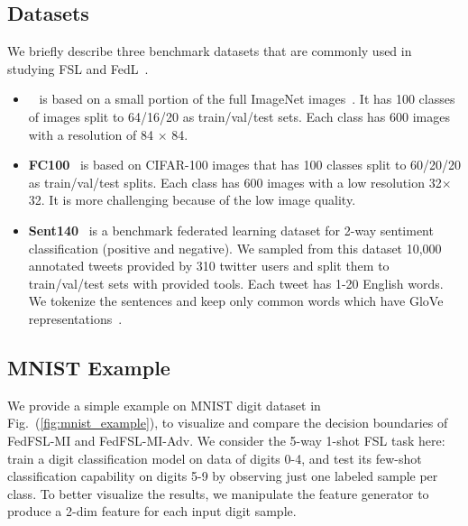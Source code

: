 \subsection{Datasets} 
We briefly describe three benchmark datasets that are commonly used in studying FSL and FedL~\cite{finn2017model,munkhdalai2017meta,li2017meta,sun2019mtl,chen2018fedmeta}.
\begin{itemize}[leftmargin=*]
\item \textbf{\mini}~\cite{vinyals2016matching} is based on a small portion of the full ImageNet images~\cite{deng2009imagenet}.
It has 100 classes of images split to 64/16/20 as train/val/test sets. Each class has 600 images with a resolution of 84 $\times$ 84. 
\item \textbf{FC100}~\cite{oreshkin2018tadam} is based on CIFAR-100 images that has 100 classes split to 60/20/20 as train/val/test splits. Each class has 600 images with a low resolution 32$\times$32. It is more challenging because of the low image quality.
\item \textbf{Sent140}~\cite{caldas2018leaf} is a benchmark federated learning  dataset for 2-way sentiment classification (positive and negative). We sampled from this dataset 10,000 annotated tweets provided by 310 twitter users and split them to train/val/test sets with provided tools. Each tweet has 1-20 English words. We tokenize the sentences and keep only common words which have GloVe representations~\cite{pennington2014glove}. 
\end{itemize}



\subsection{MNIST Example}

We provide a simple example on MNIST digit dataset in Fig.~(\ref{fig:mnist_example}), to visualize and compare the decision boundaries of FedFSL-MI and FedFSL-MI-Adv.
We consider the 5-way 1-shot FSL task here: train a digit classification model on data of digits 0-4, and test its few-shot classification capability on digits 5-9 by observing just one labeled sample per class.
To better visualize the results, we manipulate the feature generator to produce a 2-dim feature for each input digit sample. 

